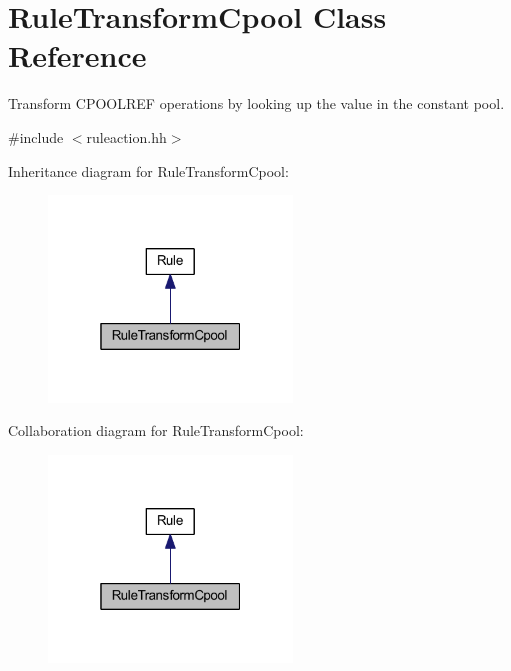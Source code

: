 \hypertarget{class_rule_transform_cpool}{}\section{Rule\+Transform\+Cpool Class Reference}
\label{class_rule_transform_cpool}


Transform C\+P\+O\+O\+L\+R\+EF operations by looking up the value in the constant pool.  




{\ttfamily \#include $<$ruleaction.\+hh$>$}



Inheritance diagram for Rule\+Transform\+Cpool\+:
\nopagebreak
\begin{figure}[H]
\begin{center}
\leavevmode
\includegraphics[width=184pt]{class_rule_transform_cpool__inherit__graph}
\end{center}
\end{figure}


Collaboration diagram for Rule\+Transform\+Cpool\+:
\nopagebreak
\begin{figure}[H]
\begin{center}
\leavevmode
\includegraphics[width=184pt]{class_rule_transform_cpool__coll__graph}
\end{center}
\end{figure}
